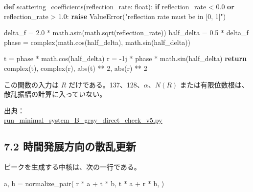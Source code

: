 \documentclass[
  10pt,
  a4paper,
]{article}
\newenvironment{Shaded}{}{}
\newcommand{\BuiltInTok}[1]{\textcolor[rgb]{0.00,0.50,0.00}{#1}}
\newcommand{\ControlFlowTok}[1]{\textcolor[rgb]{0.00,0.44,0.13}{\textbf{#1}}}
\newcommand{\DecValTok}[1]{\textcolor[rgb]{0.25,0.63,0.44}{#1}}
\newcommand{\FloatTok}[1]{\textcolor[rgb]{0.25,0.63,0.44}{#1}}
\newcommand{\KeywordTok}[1]{\textcolor[rgb]{0.00,0.44,0.13}{\textbf{#1}}}
\newcommand{\NormalTok}[1]{#1}
\newcommand{\OperatorTok}[1]{\textcolor[rgb]{0.40,0.40,0.40}{#1}}
\newcommand{\OtherTok}[1]{\textcolor[rgb]{0.00,0.44,0.13}{#1}}
\newcommand{\PreprocessorTok}[1]{\textcolor[rgb]{0.74,0.48,0.00}{#1}}
\newcommand{\StringTok}[1]{\textcolor[rgb]{0.25,0.44,0.63}{#1}}
\begin{document}
\begin{Shaded}
\begin{Highlighting}[]
\KeywordTok{def}\NormalTok{ scattering\_coefficients(reflection\_rate: }\BuiltInTok{float}\NormalTok{):}
    \ControlFlowTok{if}\NormalTok{ reflection\_rate }\OperatorTok{\textless{}} \FloatTok{0.0} \KeywordTok{or}\NormalTok{ reflection\_rate }\OperatorTok{\textgreater{}} \FloatTok{1.0}\NormalTok{:}
        \ControlFlowTok{raise} \PreprocessorTok{ValueError}\NormalTok{(}\StringTok{"reflection rate must be in [0, 1]"}\NormalTok{)}

\NormalTok{    delta\_f }\OperatorTok{=} \FloatTok{2.0} \OperatorTok{*}\NormalTok{ math.asin(math.sqrt(reflection\_rate))}
\NormalTok{    half\_delta }\OperatorTok{=} \FloatTok{0.5} \OperatorTok{*}\NormalTok{ delta\_f}
\NormalTok{    phase }\OperatorTok{=} \BuiltInTok{complex}\NormalTok{(math.cos(half\_delta), math.sin(half\_delta))}

\NormalTok{    t }\OperatorTok{=}\NormalTok{ phase }\OperatorTok{*}\NormalTok{ math.cos(half\_delta)}
\NormalTok{    r }\OperatorTok{=} \OperatorTok{{-}}\OtherTok{1j} \OperatorTok{*}\NormalTok{ phase }\OperatorTok{*}\NormalTok{ math.sin(half\_delta)}
    \ControlFlowTok{return} \BuiltInTok{complex}\NormalTok{(t), }\BuiltInTok{complex}\NormalTok{(r), }\BuiltInTok{abs}\NormalTok{(t) }\OperatorTok{**} \DecValTok{2}\NormalTok{, }\BuiltInTok{abs}\NormalTok{(r) }\OperatorTok{**} \DecValTok{2}
\end{Highlighting}
\end{Shaded}

この関数の入力は \(R\) だけである。137、128、\(\alpha\)、\(N(R)\)
または有限位数根は、散乱振幅の計算に入っていない。

出典：\\
\href{../20260715/run_minimal_system_B_gray_direct_check_v5.py\#L48-L56}{run\_minimal\_system\_B\_gray\_direct\_check\_v5.py}

\subsection{7.2
時間発展方向の散乱更新}\label{ux6642ux9593ux767aux5c55ux65b9ux5411ux306eux6563ux4e71ux66f4ux65b0}

ピークを生成する中核は、次の一行である。

\begin{Shaded}
\begin{Highlighting}[]
\NormalTok{a, b }\OperatorTok{=}\NormalTok{ normalize\_pair(}
\NormalTok{    r }\OperatorTok{*}\NormalTok{ a }\OperatorTok{+}\NormalTok{ t }\OperatorTok{*}\NormalTok{ b,}
\NormalTok{    t }\OperatorTok{*}\NormalTok{ a }\OperatorTok{+}\NormalTok{ r }\OperatorTok{*}\NormalTok{ b,}
\NormalTok{)}
\end{Highlighting}
\end{Shaded}
\end{document}
